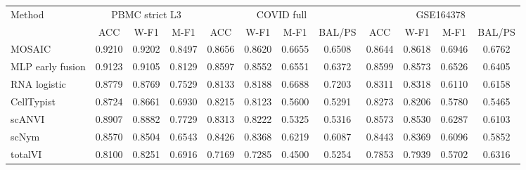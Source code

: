 \begin{tabular}{lccccccccccc}
\toprule
Method & \multicolumn{3}{c}{PBMC strict L3} & \multicolumn{4}{c}{COVID full} & \multicolumn{4}{c}{GSE164378} \\
\cmidrule(lr){2-4}\cmidrule(lr){5-8}\cmidrule(lr){9-12}
 & ACC & W-F1 & M-F1 & ACC & W-F1 & M-F1 & BAL/PS & ACC & W-F1 & M-F1 & BAL/PS \\
\midrule
MOSAIC & 0.9210 & 0.9202 & 0.8497 & 0.8656 & 0.8620 & 0.6655 & 0.6508 & 0.8644 & 0.8618 & 0.6946 & 0.6762 \\
MLP early fusion & 0.9123 & 0.9105 & 0.8129 & 0.8597 & 0.8552 & 0.6551 & 0.6372 & 0.8599 & 0.8573 & 0.6526 & 0.6405 \\
RNA logistic & 0.8779 & 0.8769 & 0.7529 & 0.8133 & 0.8188 & 0.6688 & 0.7203 & 0.8311 & 0.8318 & 0.6110 & 0.6158 \\
CellTypist & 0.8724 & 0.8661 & 0.6930 & 0.8215 & 0.8123 & 0.5600 & 0.5291 & 0.8273 & 0.8206 & 0.5780 & 0.5465 \\
scANVI & 0.8907 & 0.8882 & 0.7729 & 0.8313 & 0.8222 & 0.5325 & 0.5316 & 0.8573 & 0.8530 & 0.6287 & 0.6103 \\
scNym & 0.8570 & 0.8504 & 0.6543 & 0.8426 & 0.8368 & 0.6219 & 0.6087 & 0.8443 & 0.8369 & 0.6096 & 0.5852 \\
totalVI & 0.8100 & 0.8251 & 0.6916 & 0.7169 & 0.7285 & 0.4500 & 0.5254 & 0.7853 & 0.7939 & 0.5702 & 0.6316 \\
\bottomrule
\end{tabular}

